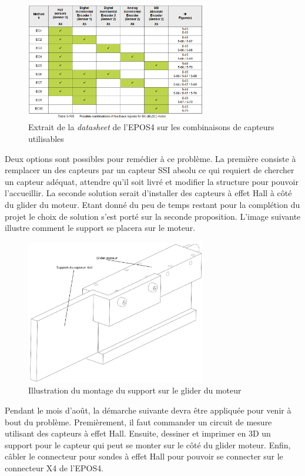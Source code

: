 \begin{figure}[H]
    \centering
    \includegraphics[width = 0.7\textwidth]{assets/figures/TableauCapteur.png}
    \caption{Extrait de la \textit{datasheet} de l'EPOS4 sur les combinaisons de capteurs utilisables}
    \label{fig:TableauCapteur}
\end{figure}

Deux options sont possibles pour remédier à ce problème. La première consiste à remplacer un des capteurs par un capteur SSI absolu ce qui
requiert de chercher un capteur adéquat, attendre qu'il soit livré et modifier la structure pour pouvoir l'accueillir. La seconde solution
serait d'installer des capteurs à effet Hall à côté du glider du moteur. Etant donné du peu de temps restant pour la complétion du projet le
choix de solution s'est porté sur la seconde proposition. L'image suivante illustre comment le support se placera sur le moteur.\\

\begin{figure}[H]
    \centering
    \includegraphics[width = 0.7\textwidth]{assets/figures/SolCapt.svg}
    \caption{Illustration du montage du support sur le glider du moteur}
    \label{fig:SolCapt}
\end{figure}

Pendant le mois d'août, la démarche suivante devra être appliquée pour venir à bout du problème. Premièrement, il faut commander un circuit de
mesure utilisant des capteurs à effet Hall. Ensuite, dessiner et imprimer en 3D un support pour le capteur qui peut se monter sur le côté du
glider moteur. Enfin, câbler le connecteur pour sondes à effet Hall pour pouvoir se connecter sur le connecteur X4 de l'EPOS4.